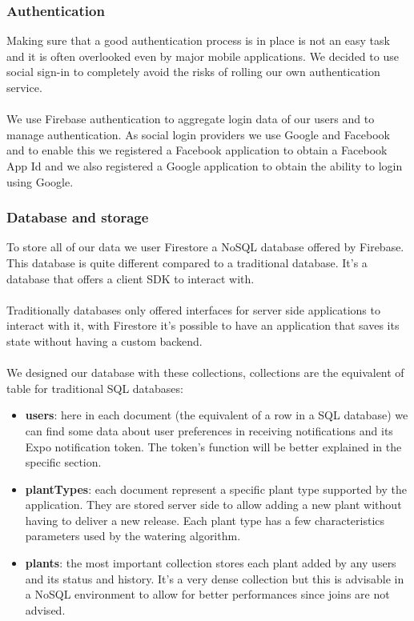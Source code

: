\documentclass[10pt]{article}
\begin{document}
	\subsubsection{Authentication}
	Making sure that a good authentication process is in place is not an easy task and it is often overlooked even by major mobile applications. We decided to use social sign-in to completely avoid the risks of rolling our own authentication service. \\\\ We use Firebase authentication to aggregate login data of our users and to manage authentication. As social login providers we use Google and Facebook and to enable this we registered a Facebook application to obtain a Facebook App Id and we also registered a Google application to obtain the ability to login using Google. 
	
	\subsubsection{Database and storage}
	To store all of our data we user Firestore a NoSQL database offered by Firebase. This database is quite different compared to a traditional database. It's a database that offers a client SDK to interact with. \\\\ Traditionally databases only offered interfaces for server side applications to interact with it, with Firestore it's possible to have an application that saves its state without having a custom backend. \\\\ We designed our database with these collections, collections are the equivalent of table for traditional SQL databases:
	\begin{itemize}
		\item \textbf{users}: here in each document (the equivalent of a row in a SQL database) we can find some data about user preferences in receiving notifications and its Expo notification token. The token's function will be better explained in the specific section.
		\item \textbf{plantTypes}: each document represent a specific plant type supported by the application. They are stored server side to allow adding a new plant without having to deliver a new release. Each plant type has a few characteristics parameters used by the watering algorithm.
		\item \textbf{plants}: the most important collection stores each plant added by any users and its status and history. It's a very dense collection but this is advisable in a NoSQL environment to allow for better performances since joins are not advised.
	\end{itemize}
	
\end{document}
